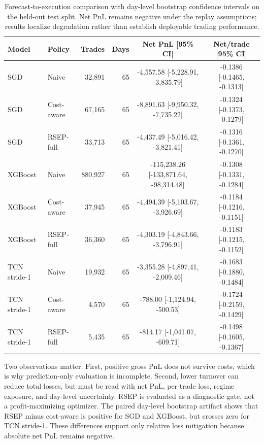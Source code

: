 \documentclass[conference]{IEEEtran}
\begin{document}
\begin{table}[t]
\centering
\caption{Forecast-to-execution comparison with day-level bootstrap confidence intervals on the held-out test split. Net PnL remains negative under the replay assumptions; results localize degradation rather than establish deployable trading performance.}
\label{tab:execution}
\scriptsize
\begin{tabular}{llrrcc}
\toprule
Model & Policy & Trades & Days & Net PnL [95\% CI] & Net/trade [95\% CI] \\
\midrule
SGD & Naive & 32,891 & 65 & -4,557.58 [-5,228.91, -3,835.79] & -0.1386 [-0.1465, -0.1313] \\
SGD & Cost-aware & 67,165 & 65 & -8,891.63 [-9,950.32, -7,735.22] & -0.1324 [-0.1373, -0.1279] \\
SGD & RSEP-full & 33,713 & 65 & -4,437.49 [-5,016.42, -3,821.41] & -0.1316 [-0.1361, -0.1270] \\
XGBoost & Naive & 880,927 & 65 & -115,238.26 [-133,871.64, -98,314.48] & -0.1308 [-0.1331, -0.1284] \\
XGBoost & Cost-aware & 37,945 & 65 & -4,494.39 [-5,103.67, -3,926.69] & -0.1184 [-0.1216, -0.1151] \\
XGBoost & RSEP-full & 36,360 & 65 & -4,303.19 [-4,843.66, -3,796.91] & -0.1183 [-0.1215, -0.1152] \\
TCN stride-1 & Naive & 19,932 & 65 & -3,355.28 [-4,897.41, -2,009.46] & -0.1683 [-0.1880, -0.1484] \\
TCN stride-1 & Cost-aware & 4,570 & 65 & -788.00 [-1,124.94, -500.53] & -0.1724 [-0.2159, -0.1429] \\
TCN stride-1 & RSEP-full & 5,435 & 65 & -814.17 [-1,041.07, -609.71] & -0.1498 [-0.1605, -0.1367] \\
\bottomrule
\end{tabular}
\end{table}

Two observations matter. First, positive gross PnL does not survive costs, which is why prediction-only evaluation is incomplete. Second, lower turnover can reduce total losses, but must be read with net PnL, per-trade loss, regime exposure, and day-level uncertainty. RSEP is evaluated as a diagnostic gate, not a profit-maximizing optimizer. The paired day-level bootstrap artifact shows that RSEP minus cost-aware is positive for SGD and XGBoost, but crosses zero for TCN stride-1. These differences support only relative loss mitigation because absolute net PnL remains negative.
\end{document}
